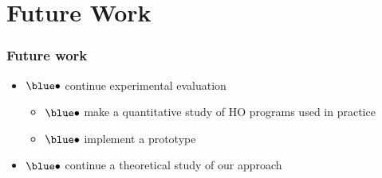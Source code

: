 \documentclass[xcolor=dvipsnames]{beamer}
\begin{document}
\section*{Future Work}
\begin{frame}
\frametitle{Future work}

\begin{itemize}
\item[]\hspace*{-3em} ${\blue \bullet}$  continue {\red experimental evaluation}  

\begin{itemize} 
	\item[] {\hspace*{-3em} ${\blue \bullet}$ \normalsize make a {quantitative study} of HO programs used in practice} 
	\item[]  {\hspace*{-3em} ${\blue \bullet}$ \normalsize implement a prototype }    \bigskip
\end{itemize} 

\item[] \hspace*{-3em} ${\blue \bullet}$ continue a {\red theoretical study} of our approach 
\end{itemize}
 \end{frame}
\end{document}
